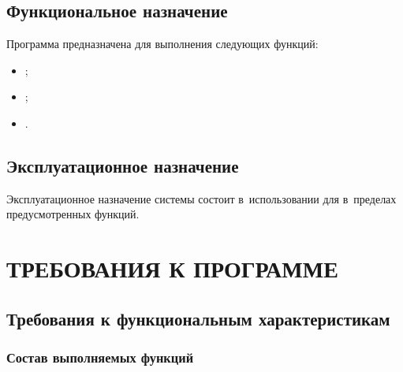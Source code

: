 \documentclass[12pt,a4paper]{extarticle}
\begin{document}
\subsection{Функциональное назначение}

Программа предназначена для выполнения следующих функций:
\begin{itemize}[nosep, leftmargin=1.25cm]
    \item {};
    \item {};
    \item {}.
\end{itemize}

\subsection{Эксплуатационное назначение}

Эксплуатационное назначение системы состоит в~использовании  для  в~пределах предусмотренных функций.

\clearpage

\section{ТРЕБОВАНИЯ К ПРОГРАММЕ}

\subsection{Требования к функциональным характеристикам}
\label{sec:functional_reqs}

\subsubsection{Состав выполняемых функций}



\clearpage
\end{document}
